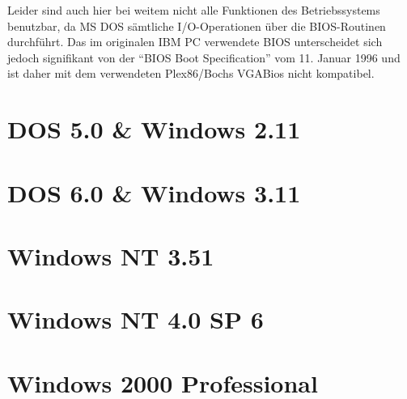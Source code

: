 	Leider sind auch hier bei weitem nicht alle Funktionen des Betriebssystems benutzbar, da MS DOS sämtliche I/O-Operationen über die BIOS-Routinen durchführt.
	Das im originalen IBM PC verwendete BIOS unterscheidet sich jedoch signifikant von der "`BIOS Boot Specification"' vom 11. Januar 1996 und ist daher mit dem verwendeten Plex86/Bochs VGABios nicht kompatibel.


\section{DOS 5.0 \& Windows 2.11}


\section{DOS 6.0 \& Windows 3.11}


\section{Windows NT 3.51}


\section{Windows NT 4.0 SP 6}


\section{Windows 2000 Professional}
